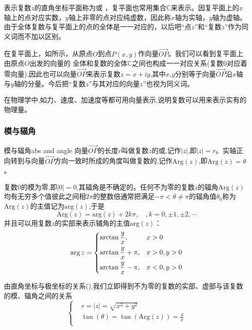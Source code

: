 	表示复数$z$的直角坐标平面称为或 ，复平面也常用集合$\mathbb{C}$来表示。因复平面上的$x$轴上的点对应实数，$y$轴上非零的点对应纯虚数，因此称$x$轴为实轴，$y$轴为虚轴。由于全体复数与复平面上的点的全体是一一对应的，以后吧“点$z$”和“复数$z$”作为同义词而不加以区别。
	
	在复平面上，如所示，从原点$O$到点$P\left(x,y\right)$作向量$\overrightarrow{OP}$。我们可以看到复平面上由原点$O$出发的向量的 全体和复数的全体$\mathbb{C}$之间也构成一一对应关系(复数$0$对应着零向量),因此也可以向量$\overrightarrow{OP}$来表示复数$z =  x+\mathrm{i}y$,其中$x$,$y$分别等于向量$\overrightarrow{OP}$沿$x$轴与$y$轴的分量。今后把“复数$z$”与其对应的向量$z$”也视为同义词。
	
	在物理学中,如力、速度、加速度等都可用向量表示,说明复数可以用来表示实有的物理量。
	
	\subsubsection{模与辐角}
	\begin{definition}{模与辐角}{abs and angle}
		向量$\overrightarrow{OP}$的长度$r$叫做复数$z$的或,记作$|z|$,即$|z| = r$。实轴正向转到与向量$\overrightarrow{OP}$方向一致时所成的角度叫做复数的,记作$\mathrm{Arg} \left(z\right)$,即$\mathrm{Arg}\left(z\right)=\theta$。	
	\end{definition}
	
	复数$0$的模为零,即$|0|=0$,其辐角是不确定的。任何不为零的复数$z$的辐角$\mathrm{Arg} \left(z\right)$均有无穷多个值彼此之间相$2\pi$的整数倍通常把满足$-\pi < \theta \ne \pi$的辐角值$\theta_0$称为$\mathrm{Arg} \left(z\right)$的主值记为$\mathrm{arg} \left(z\right)$,于是
	\begin{equation}
	\mathrm{Arg} \left(z\right)=\mathrm{arg} \left(z\right)+ 2k\pi,\quad ,k=0,\pm1,\pm2,\cdots
	\end{equation}
	并且可以用复数$z$的实部来表示辅角的主值$\mathrm{arg} \left(z\right)$：
	\begin{equation}
	\arg z = \begin{dcases}
	  {\arctan \frac{y}{x},} & {x>0} \\
	  {\arctan \frac{y}{x}+\pi,} & {x>0, y>0} \\ 
	  {\arctan \frac{y}{x}-\pi,} & {x<0, y>0}\\
	  \end{dcases}
	\end{equation}
	
	由直角坐标与极坐标的关系(),我们立即得到不为零的复数的实部、虚部与该复数的模、辐角之间的关系
	\begin{equation}
	\left\{ 
	\begin{aligned}
	{}&r = |z| = \sqrt{x^2+y^2}\\
	{}&\tan\left(\theta\right) = \tan\left(	\mathrm{Arg} \left(z\right)\right) = \frac{y}{x}\\
	\end{aligned}
	\right. 
	\end{equation}
	
